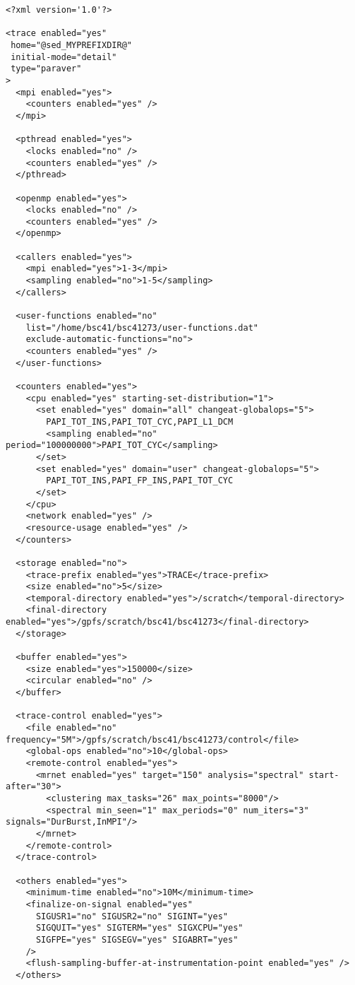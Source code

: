 \begin{verbatim}
<?xml version='1.0'?>

<trace enabled="yes"
 home="@sed_MYPREFIXDIR@"
 initial-mode="detail"
 type="paraver"
>
  <mpi enabled="yes">
    <counters enabled="yes" />
  </mpi>

  <pthread enabled="yes">
    <locks enabled="no" />
    <counters enabled="yes" />
  </pthread>

  <openmp enabled="yes">
    <locks enabled="no" />
    <counters enabled="yes" />
  </openmp>

  <callers enabled="yes">
    <mpi enabled="yes">1-3</mpi>
    <sampling enabled="no">1-5</sampling>
  </callers>

  <user-functions enabled="no"
    list="/home/bsc41/bsc41273/user-functions.dat"
    exclude-automatic-functions="no">
    <counters enabled="yes" />
  </user-functions>

  <counters enabled="yes">
    <cpu enabled="yes" starting-set-distribution="1">
      <set enabled="yes" domain="all" changeat-globalops="5">
        PAPI_TOT_INS,PAPI_TOT_CYC,PAPI_L1_DCM
        <sampling enabled="no" period="100000000">PAPI_TOT_CYC</sampling>
      </set>
      <set enabled="yes" domain="user" changeat-globalops="5">
        PAPI_TOT_INS,PAPI_FP_INS,PAPI_TOT_CYC
      </set>
    </cpu>
    <network enabled="yes" />
    <resource-usage enabled="yes" />
  </counters>

  <storage enabled="no">
    <trace-prefix enabled="yes">TRACE</trace-prefix>
    <size enabled="no">5</size>
    <temporal-directory enabled="yes">/scratch</temporal-directory>
    <final-directory enabled="yes">/gpfs/scratch/bsc41/bsc41273</final-directory>
  </storage>

  <buffer enabled="yes">
    <size enabled="yes">150000</size>
    <circular enabled="no" />
  </buffer>

  <trace-control enabled="yes">
    <file enabled="no" frequency="5M">/gpfs/scratch/bsc41/bsc41273/control</file>
    <global-ops enabled="no">10</global-ops>
    <remote-control enabled="yes">
      <mrnet enabled="yes" target="150" analysis="spectral" start-after="30">
        <clustering max_tasks="26" max_points="8000"/>
        <spectral min_seen="1" max_periods="0" num_iters="3" signals="DurBurst,InMPI"/>
      </mrnet>
    </remote-control>
  </trace-control> 

  <others enabled="yes">
    <minimum-time enabled="no">10M</minimum-time>
    <finalize-on-signal enabled="yes" 
      SIGUSR1="no" SIGUSR2="no" SIGINT="yes"
      SIGQUIT="yes" SIGTERM="yes" SIGXCPU="yes"
      SIGFPE="yes" SIGSEGV="yes" SIGABRT="yes"
    />
    <flush-sampling-buffer-at-instrumentation-point enabled="yes" />
  </others>


\end{verbatim}
